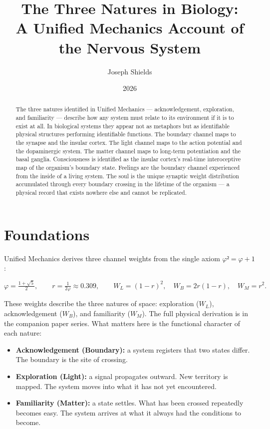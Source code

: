 \documentclass[12pt]{article}
\title{\textbf{The Three Natures in Biology:\\
A Unified Mechanics Account of the Nervous System}}
\author{Joseph Shields}
\date{2026}
\begin{document}
\maketitle

\begin{abstract}
The three natures identified in Unified Mechanics --- acknowledgement,
exploration, and familiarity --- describe how any system must relate to its
environment if it is to exist at all. In biological systems they appear not as
metaphors but as identifiable physical structures performing identifiable
functions. The boundary channel maps to the synapse and the insular cortex.
The light channel maps to the action potential and the dopaminergic system.
The matter channel maps to long-term potentiation and the basal ganglia.
Consciousness is identified as the insular cortex's real-time interoceptive map
of the organism's boundary state. Feelings are the boundary channel experienced
from the inside of a living system. The soul is the unique synaptic weight
distribution accumulated through every boundary crossing in the lifetime of the
organism --- a physical record that exists nowhere else and cannot be replicated.
\end{abstract}

\section{Foundations}

Unified Mechanics derives three channel weights from the single axiom
$φ² = φ + 1$:

\begin{equation}
  \varphi = \tfrac{1+\sqrt{5}}{2}, \qquad
  r = \tfrac{1}{2\varphi} \approx 0.309, \qquad
  W_L = (1-r)^2, \quad W_B = 2r(1-r), \quad W_M = r^2.
\end{equation}

These weights describe the three natures of space: exploration ($W_L$),
acknowledgement ($W_B$), and familiarity ($W_M$). The full physical derivation
is in the companion paper series. What matters here is the functional character
of each nature:

\begin{itemize}
  \item \textbf{Acknowledgement (Boundary):} a system registers that two states
        differ. The boundary is the site of crossing.
  \item \textbf{Exploration (Light):} a signal propagates outward. New territory
        is mapped. The system moves into what it has not yet encountered.
  \item \textbf{Familiarity (Matter):} a state settles. What has been crossed
        repeatedly becomes easy. The system arrives at what it always had the
        conditions to become.
\end{itemize}
\end{document}
